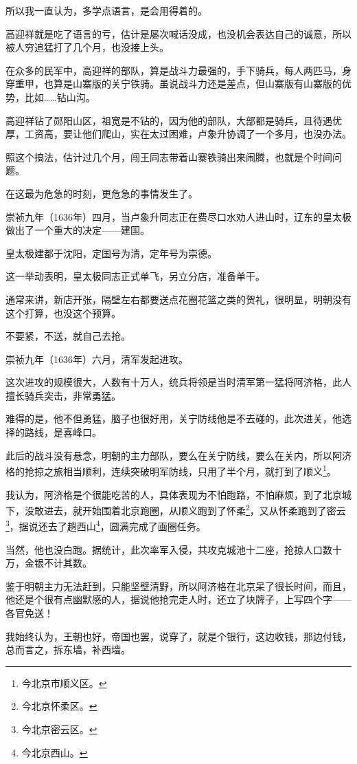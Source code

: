 \begin{multicols}{\theparacolNo}
		所以我一直认为，多学点语言，是会用得着的。

		高迎祥就是吃了语言的亏，估计是屡次喊话没成，也没机会表达自己的诚意，所以被人穷追猛打了几个月，也没接上头。

		在众多的民军中，高迎祥的部队，算是战斗力最强的，手下骑兵，每人两匹马，身穿重甲，也算是山寨版的关宁铁骑。虽说战斗力还是差点，但山寨版有山寨版的优势，比如……钻山沟。

		高迎祥钻了郧阳山区，祖宽是不钻的，因为他的部队，大部都是骑兵，且待遇优厚，工资高，要让他们爬山，实在太过困难，卢象升协调了一个多月，也没办法。

		照这个搞法，估计过几个月，闯王同志带着山寨铁骑出来闹腾，也就是个时间问题。

		在这最为危急的时刻，更危急的事情发生了。

		崇祯九年（1636年）四月，当卢象升同志正在费尽口水劝人进山时，辽东的皇太极做出了一个重大的决定——建国。

		皇太极建都于沈阳，定国号为清，定年号为崇德。

		这一举动表明，皇太极同志正式单飞，另立分店，准备单干。

		通常来讲，新店开张，隔壁左右都要送点花圈花篮之类的贺礼，很明显，明朝没有这个打算，也没这个预算。

		不要紧，不送，就自己去抢。

		崇祯九年（1636年）六月，清军发起进攻。

		这次进攻的规模很大，人数有十万人，统兵将领是当时清军第一猛将阿济格，此人擅长骑兵突击，非常勇猛。

		难得的是，他不但勇猛，脑子也很好用，关宁防线他是不去碰的，此次进关，他选择的路线，是喜峰口。

		此后的战斗没有悬念，明朝的主力部队，要么在关宁防线，要么在关内，所以阿济格的抢掠之旅相当顺利，连续突破明军防线，只用了半个月，就打到了顺义\footnote{今北京市顺义区。}。

		我认为，阿济格是个很能吃苦的人，具体表现为不怕跑路，不怕麻烦，到了北京城下，没敢进去，就开始围着北京跑圈，从顺义跑到了怀柔\footnote{今北京怀柔区。}，又从怀柔跑到了密云\footnote{今北京密云区。}，据说还去了趟西山\footnote{今北京西山。}，圆满完成了画圈任务。

		当然，他也没白跑。据统计，此次率军入侵，共攻克城池十二座，抢掠人口数十万，金银不计其数。

		鉴于明朝主力无法赶到，只能坚壁清野，所以阿济格在北京呆了很长时间，而且，他还是个很有点幽默感的人，据说他抢完走人时，还立了块牌子，上写四个字——各官免送！

		我始终认为，王朝也好，帝国也罢，说穿了，就是个银行，这边收钱，那边付钱，总而言之，拆东墙，补西墙。


\end{multicols}
